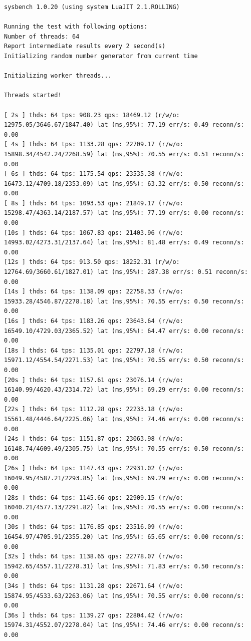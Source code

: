 \documentclass{article}
\begin{document}
\begin{verbatim}
sysbench 1.0.20 (using system LuaJIT 2.1.ROLLING)

Running the test with following options:
Number of threads: 64
Report intermediate results every 2 second(s)
Initializing random number generator from current time

Initializing worker threads...

Threads started!

[ 2s ] thds: 64 tps: 908.23 qps: 18469.12 (r/w/o: 12975.05/3646.67/1847.40) lat (ms,95%): 77.19 err/s: 0.49 reconn/s: 0.00
[ 4s ] thds: 64 tps: 1133.28 qps: 22709.17 (r/w/o: 15898.34/4542.24/2268.59) lat (ms,95%): 70.55 err/s: 0.51 reconn/s: 0.00
[ 6s ] thds: 64 tps: 1175.54 qps: 23535.38 (r/w/o: 16473.12/4709.18/2353.09) lat (ms,95%): 63.32 err/s: 0.50 reconn/s: 0.00
[ 8s ] thds: 64 tps: 1093.53 qps: 21849.17 (r/w/o: 15298.47/4363.14/2187.57) lat (ms,95%): 77.19 err/s: 0.00 reconn/s: 0.00
[10s ] thds: 64 tps: 1067.83 qps: 21403.96 (r/w/o: 14993.02/4273.31/2137.64) lat (ms,95%): 81.48 err/s: 0.49 reconn/s: 0.00
[12s ] thds: 64 tps: 913.50 qps: 18252.31 (r/w/o: 12764.69/3660.61/1827.01) lat (ms,95%): 287.38 err/s: 0.51 reconn/s: 0.00
[14s ] thds: 64 tps: 1138.09 qps: 22758.33 (r/w/o: 15933.28/4546.87/2278.18) lat (ms,95%): 70.55 err/s: 0.50 reconn/s: 0.00
[16s ] thds: 64 tps: 1183.26 qps: 23643.64 (r/w/o: 16549.10/4729.03/2365.52) lat (ms,95%): 64.47 err/s: 0.00 reconn/s: 0.00
[18s ] thds: 64 tps: 1135.01 qps: 22797.18 (r/w/o: 15971.12/4554.54/2271.53) lat (ms,95%): 70.55 err/s: 0.50 reconn/s: 0.00
[20s ] thds: 64 tps: 1157.61 qps: 23076.14 (r/w/o: 16140.99/4620.43/2314.72) lat (ms,95%): 69.29 err/s: 0.00 reconn/s: 0.00
[22s ] thds: 64 tps: 1112.28 qps: 22233.18 (r/w/o: 15561.48/4446.64/2225.06) lat (ms,95%): 74.46 err/s: 0.00 reconn/s: 0.00
[24s ] thds: 64 tps: 1151.87 qps: 23063.98 (r/w/o: 16148.74/4609.49/2305.75) lat (ms,95%): 70.55 err/s: 0.50 reconn/s: 0.00
[26s ] thds: 64 tps: 1147.43 qps: 22931.02 (r/w/o: 16049.95/4587.21/2293.85) lat (ms,95%): 69.29 err/s: 0.00 reconn/s: 0.00
[28s ] thds: 64 tps: 1145.66 qps: 22909.15 (r/w/o: 16040.21/4577.13/2291.82) lat (ms,95%): 70.55 err/s: 0.00 reconn/s: 0.00
[30s ] thds: 64 tps: 1176.85 qps: 23516.09 (r/w/o: 16454.97/4705.91/2355.20) lat (ms,95%): 65.65 err/s: 0.00 reconn/s: 0.00
[32s ] thds: 64 tps: 1138.65 qps: 22778.07 (r/w/o: 15942.65/4557.11/2278.31) lat (ms,95%): 71.83 err/s: 0.50 reconn/s: 0.00
[34s ] thds: 64 tps: 1131.28 qps: 22671.64 (r/w/o: 15874.95/4533.63/2263.06) lat (ms,95%): 70.55 err/s: 0.00 reconn/s: 0.00
[36s ] thds: 64 tps: 1139.27 qps: 22804.42 (r/w/o: 15974.31/4552.07/2278.04) lat (ms,95%): 74.46 err/s: 0.00 reconn/s: 0.00

\end{verbatim}
\end{document}
